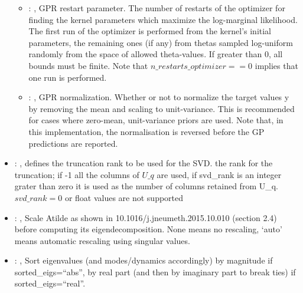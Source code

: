 \begin{itemize}
\begin{itemize}
        \item {}: , 
          GPR restart parameter. The number of restarts of the optimizer for finding the
          kernel parameters which maximize the log-marginal likelihood. The first run of the
          optimizer                                                  is performed from the kernel’s
          initial parameters, the remaining ones (if any) from thetas
          sampled log-uniform randomly from the space of allowed theta-values. If greater than 0,
          all bounds must be finite. Note that $n\_restarts\_optimizer == 0$ implies that one run is
          performed.

        \item {}: , 
          GPR normalization. Whether or not to normalize the target values y by removing the mean
          and scaling                                                  to unit-variance. This is
          recommended for cases where zero-mean, unit-variance priors are used.
          Note that, in this implementation, the normalisation is reversed before the GP predictions
          are reported.
      \end{itemize}

    \item {}: , 
      defines the truncation rank to be used for the SVD.
      the rank for the truncation; if -1 all the columns of $U\_q$ are used,
      if svd\_rank is an integer grater than zero it is used as the number
      of columns retained from U\_q. $svd\_rank=0$ or float values are not supported

    \item {}: , 
      Scale Atilde as shown in 10.1016/j.jneumeth.2015.10.010 (section 2.4) before
      computing its eigendecomposition. None means no rescaling, ‘auto’ means automatic
      rescaling using singular values.

    \item {}: , 
      Sort eigenvalues (and modes/dynamics accordingly) by magnitude if sorted\_eigs=``abs'',
      by real part (and then by imaginary part to break ties) if sorted\_eigs=``real''.
  \end{itemize}

